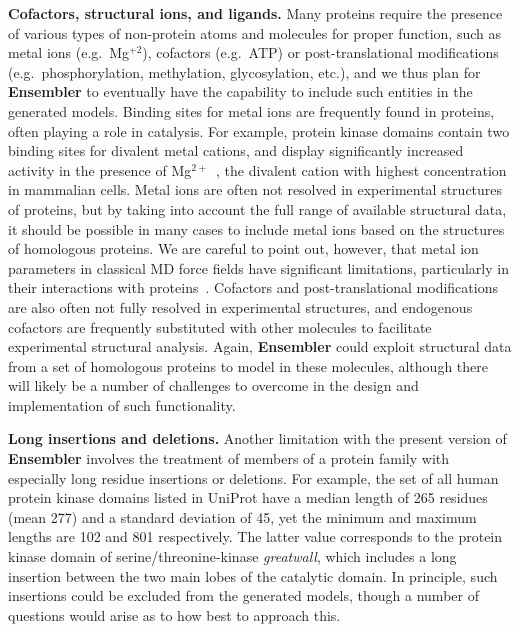 \documentclass[aps,pre,twocolumn,nofootinbib,superscriptaddress,linenumbers]{revtex4-1}
\begin{document}
{\bf Cofactors, structural ions, and ligands.}
Many proteins require the presence of various types of non-protein atoms and molecules for proper function, such as metal ions (e.g.~Mg$^{+2}$), cofactors (e.g.~ATP) or post-translational modifications (e.g.~phosphorylation, methylation, glycosylation, etc.), and we thus plan for {\bf Ensembler} to eventually have the capability to include such entities in the generated models.
Binding sites for metal ions are frequently found in proteins, often playing a role in catalysis.
For example, protein kinase domains contain two binding sites for divalent metal cations, and display significantly increased activity in the presence of Mg$^{2+}$~\cite{adams:prot-sci:1993:kinase-metal-ions}, the divalent cation with highest concentration in mammalian cells.
Metal ions are often not resolved in experimental structures of proteins, but by taking into account the full range of available structural data, it should be possible in many cases to include metal ions based on the structures of homologous proteins.
We are careful to point out, however, that metal ion parameters in classical MD force fields have significant limitations, particularly in their interactions with proteins~\cite{sousa:book:2010:metal-ion-parameters-difficulties}.
Cofactors and post-translational modifications are also often not fully resolved in experimental structures, and endogenous cofactors are frequently substituted with other molecules to facilitate experimental structural analysis.
Again, {\bf Ensembler} could exploit structural data from a set of homologous proteins to model in these molecules, although there will likely be a number of challenges to overcome in the design and implementation of such functionality.

{\bf Long insertions and deletions.}
Another limitation with the present version of {\bf Ensembler} involves the treatment of members of a protein family with especially long residue insertions or deletions.
For example, the set of all human protein kinase domains listed in UniProt have a median length of 265 residues (mean 277) and a standard deviation of 45, yet the minimum and maximum lengths are 102 and 801 respectively.
The latter value corresponds to the protein kinase domain of serine/threonine-kinase \emph{greatwall}, which includes a long insertion between the two main lobes of the catalytic domain.
In principle, such insertions could be excluded from the generated models, though a number of questions would arise as to how best to approach this.
\color{black}
\end{document}
